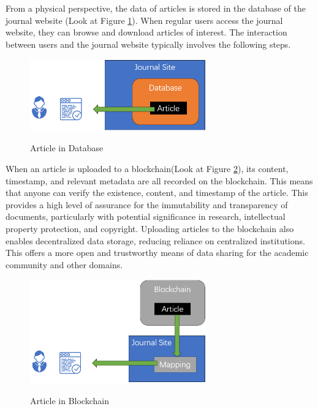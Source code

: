 \documentclass[lettersize,journal]{IEEEtran}
\begin{document}
From a physical perspective, the data of articles is stored in the database of the journal website (Look at Figure \ref{fig:journalsite}). When regular users access the journal website, they can browse and download articles of interest. The interaction between users and the journal website typically involves the following steps.



\begin{figure}[h]
  \centering
  \includegraphics[width=3in]{assets/journalsite.png}
  \label{fig:journalsite}
  \caption{Article in Database}
\end{figure}

When an article is uploaded to a blockchain(Look at Figure \ref{fig:journalchain}), its content, timestamp, and relevant metadata are all recorded on the blockchain. This means that anyone can verify the existence, content, and timestamp of the article. This provides a high level of assurance for the immutability and transparency of documents, particularly with potential significance in research, intellectual property protection, and copyright. Uploading articles to the blockchain also enables decentralized data storage, reducing reliance on centralized institutions. This offers a more open and trustworthy means of data sharing for the academic community and other domains.

\begin{figure}[h]
  \centering
  \includegraphics[width=3in]{assets/journalchain.png}
  \label{fig:journalchain}
  \caption{Article in Blockchain}
\end{figure}
\end{document}
